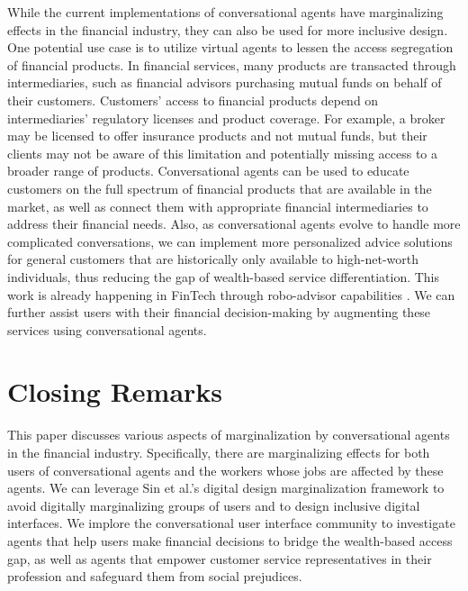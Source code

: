 \documentclass{sigchi-ext}
\begin{document}
While the current implementations of conversational agents have marginalizing effects in the financial industry, they can also be used for more inclusive design. One potential use case is to utilize virtual agents to lessen the access segregation of financial products. In financial services, many products are transacted through intermediaries, such as financial advisors purchasing mutual funds on behalf of their customers. Customers' access to financial products depend on intermediaries' regulatory licenses and product coverage. For example, a broker may be licensed to offer insurance products and not mutual funds, but their clients may not be aware of this limitation and potentially missing access to a broader range of products. Conversational agents can be used to educate customers on the full spectrum of financial products that are available in the market, as well as connect them with appropriate financial intermediaries to address their financial needs. Also, as conversational agents evolve to handle more complicated conversations, we can implement more personalized advice solutions for general customers that are historically only available to high-net-worth individuals, thus reducing the gap of wealth-based service differentiation. This work is already happening in FinTech through robo-advisor capabilities \cite{philippon2019fintech}. We can further assist users with their financial decision-making by augmenting these services using conversational agents. 


\section{Closing Remarks}

This paper discusses various aspects of marginalization by conversational agents in the financial industry. Specifically, there are marginalizing effects for both users of conversational agents and the workers whose jobs are affected by these agents. We can leverage Sin et al.\cite{sin2021digital}'s digital design marginalization framework to avoid digitally marginalizing groups of users and to design inclusive digital interfaces. We implore the conversational user interface community to investigate agents that help users make financial decisions to bridge the wealth-based access gap, as well as agents that empower customer service representatives in their profession and safeguard them from social prejudices.

\balance{} 



\end{document}
